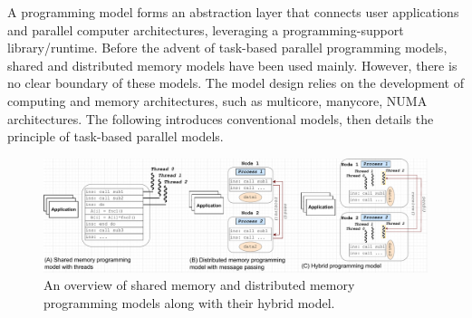 
A programming model forms an abstraction layer that connects user applications and parallel computer architectures, leveraging a programming-support library/runtime. Before the advent of task-based parallel programming models, shared and distributed memory models have been used mainly. However, there is no clear boundary of these models. The model design relies on the development of computing and memory architectures, such as multicore, manycore, NUMA architectures. The following introduces conventional models, then details the principle of task-based parallel models.\\

\begin{figure}[t]
  \centering
  \includegraphics[scale=0.485]{./pictures/preliminaries/preli_conventional_parallel_prog_models.pdf}
	\caption{An overview of shared memory and distributed memory programming models along with their hybrid model.}
	\label{fig:preli_conventional_parallel_prog_models}
\end{figure}

